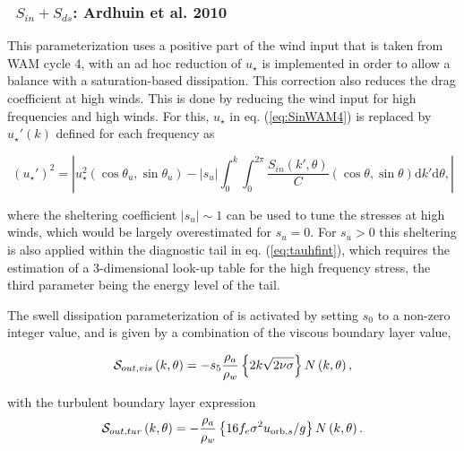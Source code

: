\vsssub
\subsubsection{~$S_{in} + S_{ds}$: Ardhuin et al. 2010} \label{sec:ST4}
\vsssub


\noindent 
This parameterization uses a positive part of the wind input that is taken
from WAM cycle 4, with an ad hoc reduction of $u_\star$ is implemented in
order to allow a balance with a saturation-based dissipation.  This correction
also reduces the drag coefficient at high winds. This is done by reducing the
wind input for high frequencies and high winds. For this, $u_\star$ in
eq. (\ref{eq:SinWAM4}) is replaced by $u_\star '(k)$ defined for each
frequency as

\begin{equation}
\left(u_\star '\right)^2=\left|u_\star^2 \left(\cos \theta_u, \sin
\theta_u \right) - \left|s_u\right| \int_0^k \int_0^{2 \pi}
\frac{S_{in}\left(k',\theta \right)}{C}  \left(\cos \theta, \sin
\theta \right)  {\mathrm d} k' \mathrm d
\theta,\label{ustarp}\right|
\end{equation}

\noindent 
where the sheltering coefficient $\left|s_u\right|\sim 1$ can be used to tune
the stresses at high winds, which would be largely overestimated for
$s_u=0$. For $s_u > 0$ this sheltering is also applied within the diagnostic
tail in eq. (\ref{eq:tauhfint}), which requires the estimation of a
3-dimensional look-up table for the high frequency stress, the third parameter
being the energy level of the tail.

The swell dissipation parameterization of \cite{art:ACC09} is activated by
setting $s_0$ to a non-zero integer value, and is given by a combination of
the viscous boundary layer value,

\begin{equation}
{\cal S}_{out,vis}\left(k,\theta\right) = - s_5 \frac{\rho_a}{\rho_w}\left\{ 2 k \sqrt{2
\nu \sigma}\right\}  N \left(k,\theta\right) \label{Sds_turb},\label{eq:Dore}
\end{equation}

\noindent
with the turbulent boundary layer expression 
\begin{equation}
{\cal S}_{out,tur} \left(k,\theta\right) = - \frac{\rho_a}{\rho_w}\left\{  16 f_e
\sigma^2 u_{\mathrm{orb},s} / g \right\}
 N\left(k,\theta\right) \label{Sds_visc}.\label{eq:swell_turb}
\end{equation}

